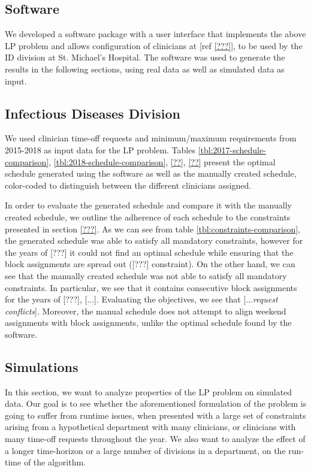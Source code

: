 \subsection{Software}
We developed a software package with a user interface that implements the above LP problem and allows configuration of clinicians at [ref \ref{???}], to be used by the ID division at St. Michael's Hospital. The software was used to generate the results in the following sections, using real data as well as simulated data as input.

\subsection{Infectious Diseases Division}
We used clinician time-off requests and minimum/maximum requirements from 2015-2018 as input data for the LP problem. Tables \ref{tbl:2017-schedule-comparison}, \ref{tbl:2018-schedule-comparison}, \ref{??}, \ref{??} present the optimal schedule generated using the software as well as the manually created schedule, color-coded to distinguish between the different clinicians assigned.




In order to evaluate the generated schedule and compare it with the manually created schedule, we outline the adherence of each schedule to the constraints presented in section \ref{???}. As we can see from table \ref{tbl:constraints-comparison}, the generated schedule was able to satisfy all mandatory constraints, however for the years of [???] it could not find an optimal schedule while ensuring that the block assignments are spread out ([???] constraint). On the other hand, we can see that the manually created schedule was not able to satisfy all mandatory constraints. In particular, we see that it contains consecutive block assignments for the years of [???], [...]. Evaluating the objectives, we see that [...\textit{request conflicts}]. Moreover, the manual schedule does not attempt to align weekend assignments with block assignments, unlike the optimal schedule found by the software.



\subsection{Simulations}
In this section, we want to analyze properties of the LP problem on simulated data. Our goal is to see whether the aforementioned formulation of the problem is going to suffer from runtime issues, when presented with a large set of constraints arising from a hypothetical department with many clinicians, or clinicians with many time-off requests throughout the year. We also want to analyze the effect of a longer time-horizon or a large number of divisions in a department, on the run-time of the algorithm. \\

